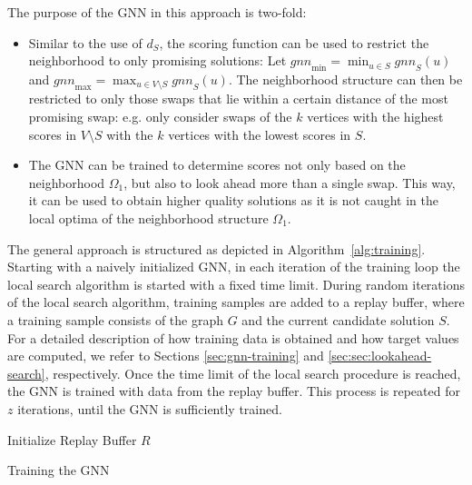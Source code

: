 \documentclass[draft,final]{vutinfth} %
\begin{document}
The purpose of the GNN in this approach is two-fold: 
\begin{itemize}
    \item Similar to the use of $d_S$, the scoring function can be used to restrict the neighborhood to only promising solutions: 
    Let $\mathit{gnn}_{\min} = \min_{u \in S} \mathit{gnn}_S(u)$ and $\mathit{gnn}_{\max} = \max_{u \in V \setminus S} \mathit{gnn}_S(u)$. 
    The neighborhood structure can then be restricted to only those swaps that lie within a certain distance of the most promising swap: e.g. only consider swaps of the $k$ vertices with the highest scores in $V \setminus S$ with the $k$ vertices with the lowest scores in $S$. 
    \item The GNN can be trained to determine scores not only based on the neighborhood $\Omega_1$, but also to look ahead more than a single swap. This way, it can be used to obtain higher quality solutions as it is not caught in the local optima of the neighborhood structure $\Omega_1$.
\end{itemize}

The general approach is structured as depicted in Algorithm~\ref{alg:training}. 
Starting with a naively initialized GNN, in each iteration of the training loop the local search algorithm is started with a fixed time limit. During random iterations of the local search algorithm, training samples are added to a replay buffer, where a training sample consists of the graph $G$ and the current candidate solution $S$. For a detailed description of how training data is obtained and how target values are computed, we refer to Sections \ref{sec:gnn-training} and \ref{sec:sec:lookahead-search}, respectively. 
Once the time limit of the local search procedure is reached, the GNN is trained with data from the replay buffer. 
This process is repeated for $z$ iterations, until the GNN is sufficiently trained. 

\begin{algorithm}
    \DontPrintSemicolon
    Initialize Replay Buffer $R$ \;
    \caption{Training the GNN}
    \label{alg:training}
\end{algorithm}
\end{document}
